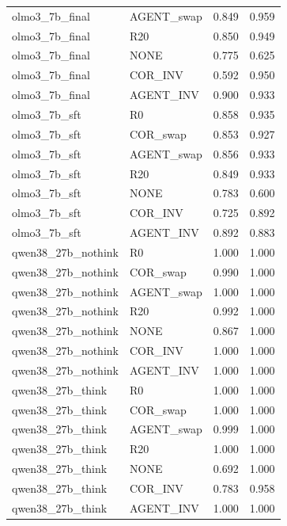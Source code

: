 {\begin{longtable}{llrr}
olmo3\_7b\_final & AGENT\_swap & 0.849 & 0.959 \\
olmo3\_7b\_final & R20 & 0.850 & 0.949 \\
olmo3\_7b\_final & NONE & 0.775 & 0.625 \\
olmo3\_7b\_final & COR\_INV & 0.592 & 0.950 \\
olmo3\_7b\_final & AGENT\_INV & 0.900 & 0.933 \\
olmo3\_7b\_sft & R0 & 0.858 & 0.935 \\
olmo3\_7b\_sft & COR\_swap & 0.853 & 0.927 \\
olmo3\_7b\_sft & AGENT\_swap & 0.856 & 0.933 \\
olmo3\_7b\_sft & R20 & 0.849 & 0.933 \\
olmo3\_7b\_sft & NONE & 0.783 & 0.600 \\
olmo3\_7b\_sft & COR\_INV & 0.725 & 0.892 \\
olmo3\_7b\_sft & AGENT\_INV & 0.892 & 0.883 \\
qwen38\_27b\_nothink & R0 & 1.000 & 1.000 \\
qwen38\_27b\_nothink & COR\_swap & 0.990 & 1.000 \\
qwen38\_27b\_nothink & AGENT\_swap & 1.000 & 1.000 \\
qwen38\_27b\_nothink & R20 & 0.992 & 1.000 \\
qwen38\_27b\_nothink & NONE & 0.867 & 1.000 \\
qwen38\_27b\_nothink & COR\_INV & 1.000 & 1.000 \\
qwen38\_27b\_nothink & AGENT\_INV & 1.000 & 1.000 \\
qwen38\_27b\_think & R0 & 1.000 & 1.000 \\
qwen38\_27b\_think & COR\_swap & 1.000 & 1.000 \\
qwen38\_27b\_think & AGENT\_swap & 0.999 & 1.000 \\
qwen38\_27b\_think & R20 & 1.000 & 1.000 \\
qwen38\_27b\_think & NONE & 0.692 & 1.000 \\
qwen38\_27b\_think & COR\_INV & 0.783 & 0.958 \\
qwen38\_27b\_think & AGENT\_INV & 1.000 & 1.000 \\
\end{longtable}}
